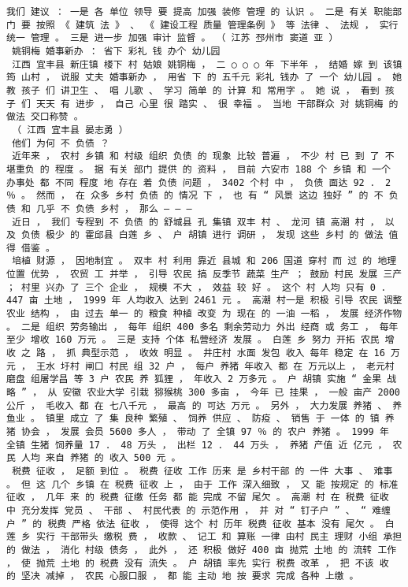 \documentclass{article}
\begin{document}
\begin{Verbatim}[commandchars=\\\{\}]
 我们 建议 ： 一是 各 单位 领导 要 提高 加强 装修 管理 的 认识 。 二是 有关 职能部门 要 按照 《 建筑 法 》 、 《 建设工程 质量 管理条例 》 等 法律 、 法规 ， 实行 统一 管理 。 三是 进一步 加强 审计 监督 。 （ 江苏 邳州市 窦道 亚 ） 
 姚铜梅 婚事新办 ： 省下 彩礼 钱 办个 幼儿园 
 江西 宜丰县 新庄镇 楼下 村 姑娘 姚铜梅 ， 二 ○ ○ ○ 年 下半年 ， 结婚 嫁 到 该镇 筠 山村 ， 说服 丈夫 婚事新办 ， 用省 下 的 五千元 彩礼 钱办 了 一个 幼儿园 。 她 教 孩子 们 讲卫生 、 唱 儿歌 、 学习 简单 的 计算 和 常用字 。 她 说 ， 看到 孩子 们 天天 有 进步 ， 自己 心里 很 踏实 、 很 幸福 。 当地 干部群众 对 姚铜梅 的 做法 交口称赞 。 
 （ 江西 宜丰县 晏志勇 ） 
 他们 为何 不 负债 ？ 
 近年来 ， 农村 乡镇 和 村级 组织 负债 的 现象 比较 普遍 ， 不少 村 已 到 了 不堪重负 的 程度 。 据 有关 部门 提供 的 资料 ， 目前 六安市 188 个 乡镇 和 一个 办事处 都 不同 程度 地 存在 着 负债 问题 ， 3402 个村 中 ， 负债 面达 92 ． 2 ％ 。 然而 ， 在 众多 乡村 负债 的 情况 下 ， 也 有 “ 风景 这边 独好 ” 的 不 负债 和 几乎 不 负债 乡村 ， 那么 — — — 
 近日 ， 我们 专程到 不 负债 的 舒城县 孔 集镇 双丰 村 、 龙河 镇 高潮 村 ， 以及 负债 极少 的 霍邱县 白莲 乡 、 户 胡镇 进行 调研 ， 发现 这些 乡村 的 做法 值得 借鉴 。 
 培植 财源 ， 因地制宜 。 双丰 村 利用 靠近 县城 和 206 国道 穿村 而 过 的 地理位置 优势 ， 农贸 工 并举 ， 引导 农民 搞 反季节 蔬菜 生产 ； 鼓励 村民 发展 三产 ； 村里 兴办 了 三个 企业 ， 规模 不大 ， 效益 较 好 。 这个 村 人均 只有 0 ． 447 亩 土地 ， 1999 年 人均收入 达到 2461 元 。 高潮 村一是 积极 引导 农民 调整 农业 结构 ， 由 过去 单一 的 粮食 种植 改变 为 现在 的 一油 一稻 ， 发展 经济作物 。 二是 组织 劳务输出 ， 每年 组织 400 多名 剩余劳动力 外出 经商 或 务工 ， 每年 至少 增收 160 万元 。 三是 支持 个体 私营经济 发展 。 白莲 乡 努力 开拓 农民 增收 之 路 ， 抓 典型示范 ， 收效 明显 。 井庄村 水面 发包 收入 每年 稳定 在 16 万元 ， 王水 圩村 闸口 村民 组 32 户 ， 每户 养猪 年收入 都 在 万元以上 ， 老元村 磨盘 组屠学昌 等 3 户 农民 养 狐狸 ， 年收入 2 万多元 。 户 胡镇 实施 “ 金果 战略 ” ， 从 安徽 农业大学 引栽 猕猴桃 300 多亩 ， 今年 已 挂果 ， 一般 亩产 2000 公斤 ， 毛收入 都 在 七八千元 ， 最高 的 可达 万元 。 另外 ， 大力发展 养猪 、 养鱼业 。 镇里 成立 了 集 良种 繁殖 、 饲养 供应 、 防疫 、 销售 于 一体 的 镇 养猪 协会 ， 发展 会员 5600 多人 ， 带动 了 全镇 97 ％ 的 农户 养猪 。 1999 年 全镇 生猪 饲养量 17 ． 48 万头 ， 出栏 12 ． 44 万头 ， 养猪 产值 近 亿元 ， 农民 人均 来自 养猪 的 收入 500 元 。 
 税费 征收 ， 足额 到位 。 税费 征收 工作 历来 是 乡村干部 的 一件 大事 、 难事 。 但 这 几个 乡镇 在 税费 征收 上 ， 由于 工作 深入细致 ， 又 能 按规定 的 标准 征收 ， 几年 来 的 税费 征缴 任务 都 能 完成 不留 尾欠 。 高潮 村 在 税费 征收 中 充分发挥 党员 、 干部 、 村民代表 的 示范作用 ， 并 对 “ 钉子户 ” 、 “ 难缠 户 ” 的 税费 严格 依法 征收 ， 使得 这个 村 历年 税费 征收 基本 没有 尾欠 。 白莲 乡 实行 干部带头 缴税 费 ， 收款 、 记工 和 算账 一律 由村 民主 理财 小组 承担 的 做法 ， 消化 村级 债务 ， 此外 ， 还 积极 做好 400 亩 抛荒 土地 的 流转 工作 ， 使 抛荒 土地 的 税费 没有 流失 。 户 胡镇 率先 实行 税费 改革 ， 把 不该 收 的 坚决 减掉 ， 农民 心服口服 ， 都 能 主动 地 按 要求 完成 各种 上缴 。 

\end{Verbatim}
\end{document}
